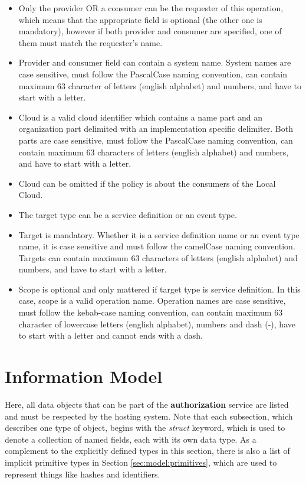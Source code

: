 \documentclass[a4paper]{arrowhead}
\begin{document}
\begin{itemize}
    \item Only the provider OR a consumer can be the requester of this operation, which means that the appropriate field is optional (the other one is mandatory), however if both provider and consumer are specified, one of them must match the requester's name.
    \item Provider and consumer field can contain a system name. System names are case sensitive, must follow the PascalCase naming convention, can contain maximum 63 character of letters (english alphabet) and numbers, and have to start with a letter.
    \item Cloud is a valid cloud identifier which contains a name part and an organization part delimited with an implementation specific delimiter. Both parts are case sensitive, must follow the PascalCase naming convention, can contain maximum 63 characters of letters (english alphabet) and numbers, and have to start with a letter.
    \item Cloud can be omitted if the policy is about the consumers of the Local Cloud. 
    \item The target type can be a service definition or an event type. 
    \item Target is mandatory. Whether it is a service definition name or an event type name, it is case sensitive and must follow the camelCase naming convention. Targets can contain maximum 63 characters of letters (english alphabet) and numbers, and have to start with a letter.
    \item Scope is optional and only mattered if target type is service definition. In this case, 
    scope is a valid operation name. Operation names are case sensitive, must follow the kebab-case naming convention, can contain maximum 63 character of lowercase letters (english alphabet), numbers and dash (-), have to start with a letter and cannot ends with a dash.
\end{itemize}

\clearpage

\section{Information Model}
\label{sec:model}

Here, all data objects that can be part of the \textbf{authorization} service are listed and must be respected by the hosting system.
Note that each subsection, which describes one type of object, begins with the \textit{struct} keyword, which is used to denote a collection of named fields, each with its own data type.
As a complement to the explicitly defined types in this section, there is also a list of implicit primitive types in Section \ref{sec:model:primitives}, which are used to represent things like hashes and identifiers.
\end{document}
